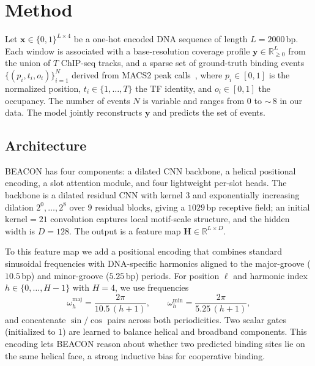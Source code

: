 \documentclass{article}
\begin{document}
\section{Method}

Let $\mathbf{x}\!\in\!\{0,1\}^{L\times 4}$ be a one-hot encoded DNA sequence of length $L{=}2000$\,bp. Each window is associated with a base-resolution coverage profile $\mathbf{y}\!\in\!\mathbb{R}_{\ge 0}^{L}$ from the union of $T$ ChIP-seq tracks, and a sparse set of ground-truth binding events $\{(p_i, t_i, o_i)\}_{i=1}^{N}$ derived from MACS2 peak calls~\citep{zhang2008macs}, where $p_i\!\in\![0,1]$ is the normalized position, $t_i\!\in\!\{1,\ldots,T\}$ the TF identity, and $o_i\!\in\![0,1]$ the occupancy. The number of events $N$ is variable and ranges from $0$ to $\sim$\,$8$ in our data. The model jointly reconstructs $\mathbf{y}$ and predicts the set of events.

\subsection{Architecture}
BEACON has four components: a dilated CNN backbone, a helical positional encoding, a slot attention module, and four lightweight per-slot heads. The backbone is a dilated residual CNN with kernel $3$ and exponentially increasing dilation $2^0,\ldots,2^8$ over $9$ residual blocks, giving a $1029$\,bp receptive field; an initial $\text{kernel}{=}21$ convolution captures local motif-scale structure, and the hidden width is $D{=}128$. The output is a feature map $\mathbf{H}\!\in\!\mathbb{R}^{L\times D}$.

To this feature map we add a positional encoding that combines standard sinusoidal frequencies with DNA-specific harmonics aligned to the major-groove ($10.5$\,bp) and minor-groove ($5.25$\,bp) periods. For position $\ell$ and harmonic index $h\!\in\!\{0,\ldots,H{-}1\}$ with $H{=}4$, we use frequencies
\begin{equation}
\omega^{\text{maj}}_{h} = \frac{2\pi}{10.5\,(h{+}1)},\qquad
\omega^{\text{min}}_{h} = \frac{2\pi}{5.25\,(h{+}1)},
\end{equation}
and concatenate $\sin/\cos$ pairs across both periodicities. Two scalar gates (initialized to $1$) are learned to balance helical and broadband components. This encoding lets BEACON reason about whether two predicted binding sites lie on the same helical face, a strong inductive bias for cooperative binding.
\end{document}
